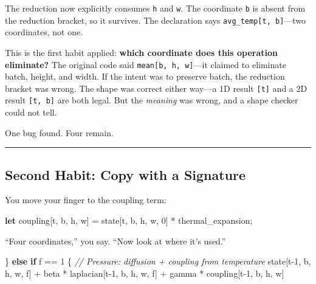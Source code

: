 \documentclass[11pt,]{article}
\newenvironment{Shaded}{}{}
\newcommand{\CommentTok}[1]{\textcolor[rgb]{0.38,0.63,0.69}{\textit{#1}}}
\newcommand{\DecValTok}[1]{\textcolor[rgb]{0.25,0.63,0.44}{#1}}
\newcommand{\KeywordTok}[1]{\textcolor[rgb]{0.00,0.44,0.13}{\textbf{#1}}}
\newcommand{\NormalTok}[1]{#1}
\newcommand{\OperatorTok}[1]{\textcolor[rgb]{0.40,0.40,0.40}{#1}}
\begin{document}
The reduction now explicitly consumes \texttt{h} and \texttt{w}. The
coordinate \texttt{b} is absent from the reduction bracket, so it
survives. The declaration says \texttt{avg\_temp{[}t,\ b{]}}---two
coordinates, not one.

This is the first habit applied: \textbf{which coordinate does this
operation eliminate?} The original code said
\texttt{mean{[}b,\ h,\ w{]}}---it claimed to eliminate batch, height,
and width. If the intent was to preserve batch, the reduction bracket
was wrong. The shape was correct either way---a 1D result
\texttt{{[}t{]}} and a 2D result \texttt{{[}t,\ b{]}} are both legal.
But the \emph{meaning} was wrong, and a shape checker could not tell.

One bug found. Four remain.

\begin{center}\rule{0.5\linewidth}{0.4pt}\end{center}

\hypertarget{second-habit-copy-with-a-signature}{%
\subsection{Second Habit: Copy with a
Signature}\label{second-habit-copy-with-a-signature}}

You move your finger to the coupling term:

\begin{Shaded}
\begin{Highlighting}[]
\KeywordTok{let}\NormalTok{ coupling}\OperatorTok{[}\NormalTok{t, b, h, w}\OperatorTok{]}\NormalTok{ =}
\NormalTok{    state}\OperatorTok{[}\NormalTok{t, b, h, w, }\DecValTok{0}\OperatorTok{]}\NormalTok{ * thermal_expansion;}
\end{Highlighting}
\end{Shaded}

``Four coordinates,'' you say. ``Now look at where it's used.''

\begin{Shaded}
\begin{Highlighting}[]
\OperatorTok{\}} \KeywordTok{else} \KeywordTok{if}\NormalTok{ f == }\DecValTok{1} \OperatorTok{\{}
    \CommentTok{// Pressure: diffusion + coupling from temperature}
\NormalTok{    state}\OperatorTok{[}\NormalTok{t-}\DecValTok{1}\NormalTok{, b, h, w, f}\OperatorTok{]}\NormalTok{ + beta * laplacian}\OperatorTok{[}\NormalTok{t-}\DecValTok{1}\NormalTok{, b, h, w, f}\OperatorTok{]}
\NormalTok{        + gamma * coupling}\OperatorTok{[}\NormalTok{t-}\DecValTok{1}\NormalTok{, b, h, w}\OperatorTok{]}
\end{Highlighting}
\end{Shaded}
\end{document}
